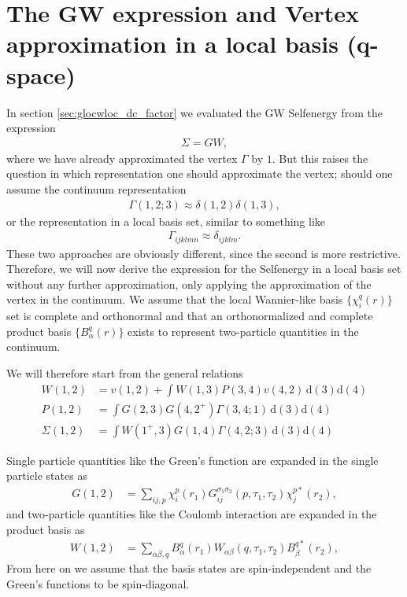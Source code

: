 \documentclass[12pt,a4paper]{scrartcl}
\numberwithin{equation}{section}
\begin{document}
\section{The GW expression and Vertex approximation in a local basis (q-space)}
In section \ref{sec:glocwloc_dc_factor} we evaluated the GW Selfenergy
from the expression 
\begin{align}
 \Sigma = GW,
\end{align}
where we have already approximated the vertex $\Gamma$ by $1$.
But this raises the question in which representation one should approximate
the vertex; should one assume the continuum representation
\begin{align}
 \Gamma(1,2;3) \approx  \delta(1,2)\delta(1,3),
\end{align}
or the representation in a local basis set, similar to something like
\begin{align}
 \Gamma_{ijklmn} \approx  \delta_{ijklm} .
\end{align}
These two approaches are obviously different, since the second is more restrictive.
Therefore, we will now derive the expression for the Selfenergy
in a local basis set without any further approximation, only
applying the approximation of the vertex in the continuum.
We assume that the local Wannier-like basis $\{ \chi^q_{i}(r) \}$ set is complete 
and orthonormal 
and that an orthonormalized and complete product basis $\{ B^q_\alpha(r) \}$
exists to represent two-particle quantities in the continuum.

We will therefore start from the general relations
\begin{align}
W(1,2)
 &= v(1,2)
  + \int  W(1,3) P(3,4) v(4,2) \, \mathrm{d}(3)\mathrm{d}(4) \label{eq:w_continuum} \\
%
P(1,2) &= \int G(2,3)G(4,2^+) \Gamma(3,4;1) \, \mathrm{d}(3)\mathrm{d}(4) \\
%
\Sigma(1,2)
&= \int W(1^+,3) G(1,4) \Gamma(4,2;3) \, \mathrm{d}(3)\mathrm{d}(4)
\end{align}

Single particle quantities like the Green's function are expanded in the single 
particle states as
\begin{align}
 G(1,2)  
 &= \sum_{ij,p} \chi^p_{i}(r_1) G^{\sigma_1\sigma_2}_{ij}(p,\tau_1,\tau_2) \chi^{p*}_{j}(r_2),
\end{align}
and two-particle quantities like the Coulomb interaction are expanded in the product
basis as
\begin{align}
 W(1,2)  
 &= \sum_{\alpha\beta,q} B^q_\alpha(r_1) W_{\alpha\beta}(q,\tau_1,\tau_2) B^{q*}_{\beta}(r_2),
\end{align}
From here on we assume that the basis states are spin-independent and the
Green's functions to be spin-diagonal.
\end{document}
